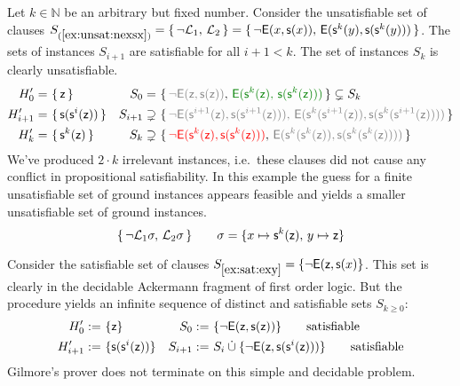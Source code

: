 %

\begin{example}\label{ex:unsat:nexsx}
	Let \( k\in\mathbb{N} \) be an arbitrary but fixed number.
	Consider the unsatisfiable set of clauses
	\(
		S_{(\ref{ex:unsat:nexsx})} = \{ \, \lnot\mathcal{L}_1, \, \mathcal{L}_2 \, \} =
		 \{ \,
		{ \lnot\mathsf{E}(x, \mathsf{s}(x)) }, \,
		{ \mathsf{E}(\mathsf{s}^{k}(y), \mathsf{s}(\mathsf{s}^{k}(y)))}
		 \, \}
	 \).
	The sets of instances \( S_{i+1} \) are satisfiable for all \( i+1<k \).
	The set of instances \( S_{k} \) is clearly unsatisfiable.
	\begin{align*}
	H'_{0} =&{\ } \{ \, \mzero{} \, \}
	&
	S_{0} =&{\ } \{ \,
	{\colG \lnot\mE(\mzero,\msucc(\mzero))}, \,
	{\colHi \mE(\msucc^k(\mzero), \, \msucc(\msucc^k(\mzero)))}
	 \, \}
	\subsetneq S_k
	\\
	H'_{i+1} =&{\ } \{ \, \msucc(\msucc^{i}(\mzero)) \, \}
	&
	S_{i+1} \supsetneq&\
	 \{ \,
	{\colG \lnot\mE(\msucc^{i+1}(\mzero),\msucc(\msucc^{i+1}(\mzero))), \,
		\mE(\msucc^k(\msucc^{i+1}(\mzero)), \msucc(\msucc^k(\msucc^{i+1}(\mzero))))}
	 \, \}
	\\
	H'_{k} =&{\ } \{ \, \msucc^{k}(\mzero) \, \}
	&
	S_{k} \supsetneq&\
	 \{ \,
	{\colLo \lnot\mE(\msucc^{k}(\mzero),\msucc(\msucc^{k}(\mzero)))}, \,
	{\colG\mE(\msucc^k(\msucc^{k}(\mzero)), \msucc(\msucc^k(\msucc^{k}(\mzero))))}
	 \, \}
	\end{align*}
	We've produced \( 2\cdot k \)
	{ irrelevant} instances,
	i.e.~these clauses did not cause any conflict in
	propositional satisfiability.
	In this example the guess for a finite unsatisfiable set of ground instances appears feasible and yields a smaller unsatisfiable set of ground instances.
	\[
	 \{ \,
	\lnot\mathcal{L}_1\sigma, \, \mathcal{L}_2\sigma
	 \, \} \qquad \sigma= \{ x\mapsto \mathsf{s}^k(\mathsf{z}), \, y\mapsto \mathsf{z} \}
	\]
\end{example}

\begin{example}\label{ex:sat:exy}
	Consider the satisfiable set of clauses
	\( S_{\ref{ex:sat:exy}}= \{ \lnot\mathsf{E}(\mathsf{z},\mathsf{s}(x)\} \).
	This set is clearly in the decidable Ackermann fragment of first order logic.
	But the procedure yields an infinite sequence of distinct and satisfiable sets \( S_{k\geq0} \):
	\begin{align*}
	H'_{0} :=&{\ } \{ \mathsf{z} \}
	&
	S_{0} :=&{\ } \{ \lnot\mathsf{E}(\mathsf{z},\mathsf{s}(\mathsf{z}))
	\}
	\tag*{satisfiable}
	\\
	H'_{i+1} :=&{\ } \{ \mathsf{s}(\mathsf{s}^{i}(\mathsf{z})) \}
	&
	S_{i+1} :=&{\ }S_i \mathbin{\dot\cup}
	 \{
	\lnot\mathsf{E}(\mathsf{z},\mathsf{s}(\mathsf{s}^i(\mathsf{z})))
	\}
	\tag*{satisfiable}
	\end{align*}
	Gilmore's prover does not terminate on this simple and decidable problem.
\end{example}



